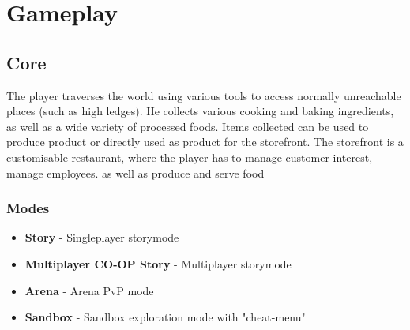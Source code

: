 \documentclass[10pt,a4paper]{article}
\begin{document}
\section{Gameplay}
\subsection{Core}
The player traverses the world using various tools to access normally unreachable places (such as high ledges). He collects various cooking and baking ingredients, as well as a wide variety of processed foods. Items collected can be used to produce product or directly used as product for the storefront. The storefront is a customisable restaurant, where the player has to manage customer interest, manage employees. as well as produce and serve food
\subsubsection{Modes}
\begin{itemize}
	\item \textbf{Story} - Singleplayer storymode
	\item \textbf{Multiplayer CO-OP Story} - Multiplayer storymode
	\item \textbf{Arena} - Arena PvP mode
	\item \textbf{Sandbox} - Sandbox exploration mode with "cheat-menu"
\end{itemize}
\end{document}
